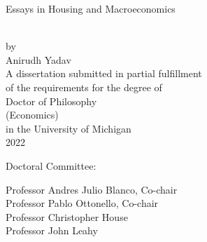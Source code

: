 \begin{titlepage}
 \begin{singlespace} %
  \hbox{\vspace{1.2in}} %
  \begin{center} %
   \begin{onehalfspacing}
    { Essays in Housing and Macroeconomics} %
   \end{onehalfspacing} \\[4ex] %
   by \\[2ex] %
   Anirudh Yadav \\ %
   \vfill %
   A dissertation submitted in partial fulfillment \\ %
   of the requirements for the degree of \\ %
   Doctor of Philosophy \\ %
   (Economics) \\ %
   in the University of Michigan \\ %
   2022 %
  \end{center} %
  \vfill %
  \begin{flushleft}
   \hspace{0.7in}Doctoral Committee: \\[2ex] %
   \hspace{1in} %
   \parbox{4.2in}{Professor Andres Julio Blanco, Co-chair\\
                  Professor Pablo Ottonello, Co-chair\\
                  Professor Christopher House\\
                  Professor John Leahy}
  \end{flushleft} %
 \end{singlespace} %
\end{titlepage}

\clearpage
\thispagestyle{empty}

\hspace{0pt}

\vfill

